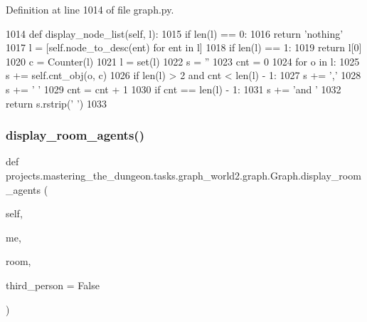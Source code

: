 Definition at line 1014 of file graph.\+py.


\begin{DoxyCode}
1014     \textcolor{keyword}{def }display\_node\_list(self, l):
1015         \textcolor{keywordflow}{if} len(l) == 0:
1016             \textcolor{keywordflow}{return} \textcolor{stringliteral}{'nothing'}
1017         l = [self.node\_to\_desc(ent) \textcolor{keywordflow}{for} ent \textcolor{keywordflow}{in} l]
1018         \textcolor{keywordflow}{if} len(l) == 1:
1019             \textcolor{keywordflow}{return} l[0]
1020         c = Counter(l)
1021         l = set(l)
1022         s = \textcolor{stringliteral}{''}
1023         cnt = 0
1024         \textcolor{keywordflow}{for} o \textcolor{keywordflow}{in} l:
1025             s += self.cnt\_obj(o, c)
1026             \textcolor{keywordflow}{if} len(l) > 2 \textcolor{keywordflow}{and} cnt < len(l) - 1:
1027                 s += \textcolor{stringliteral}{','}
1028             s += \textcolor{stringliteral}{' '}
1029             cnt = cnt + 1
1030             \textcolor{keywordflow}{if} cnt == len(l) - 1:
1031                 s += \textcolor{stringliteral}{'and '}
1032         \textcolor{keywordflow}{return} s.rstrip(\textcolor{stringliteral}{' '})
1033 
\end{DoxyCode}
\mbox{\label{classprojects_1_1mastering__the__dungeon_1_1tasks_1_1graph__world2_1_1graph_1_1Graph_a53875bd0094c23c7f852f2320a6a8b25}} 
\subsubsection{\texorpdfstring{display\+\_\+room\+\_\+agents()}{display\_room\_agents()}}
{\footnotesize\ttfamily def projects.\+mastering\+\_\+the\+\_\+dungeon.\+tasks.\+graph\+\_\+world2.\+graph.\+Graph.\+display\+\_\+room\+\_\+agents (\begin{DoxyParamCaption}\item[{}]{self,  }\item[{}]{me,  }\item[{}]{room,  }\item[{}]{third\+\_\+person = {\ttfamily False} }\end{DoxyParamCaption})}



